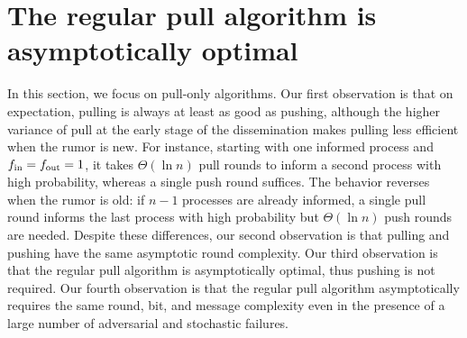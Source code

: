 
\section{The regular pull algorithm is asymptotically optimal}
\label{sec:pull}

In this section, we focus on pull-only algorithms. 
Our first observation is that on expectation, pulling is always at least as good as pushing, although the higher variance of pull at the early stage of the dissemination makes pulling less efficient when the rumor is new. For instance, starting with one informed process and $f_\text{in}=f_\text{out}=1$, it takes $\Theta(\ln n)$ pull rounds to inform a second process with high probability, whereas a single push round suffices. The behavior reverses when the rumor is old: if $n-1$ processes are already informed, a single pull round informs the last process with high probability but $\Theta(\ln n)$ push rounds are needed. Despite these differences, our second observation is that pulling and pushing have the same asymptotic round complexity. Our third observation is that the regular pull algorithm is asymptotically optimal, thus pushing is not required. 
Our fourth observation is that the regular pull algorithm asymptotically requires the same round, bit, and message complexity even in the presence of a large number of adversarial and stochastic failures.

